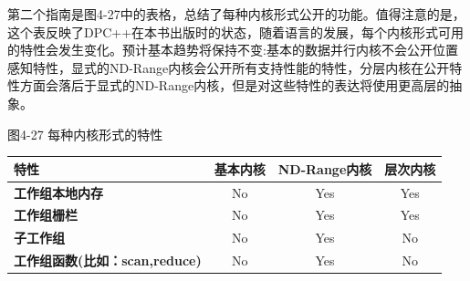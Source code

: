第二个指南是图4-27中的表格，总结了每种内核形式公开的功能。值得注意的是，这个表反映了DPC++在本书出版时的状态，随着语言的发展，每个内核形式可用的特性会发生变化。预计基本趋势将保持不变:基本的数据并行内核不会公开位置感知特性，显式的ND-Range内核会公开所有支持性能的特性，分层内核在公开特性方面会落后于显式的ND-Range内核，但是对这些特性的表达将使用更高层的抽象。\par

\hspace*{\fill} \par %
图4-27 每种内核形式的特性
\begin{table}[H]
	\begin{tabular}{|l|c|c|c|}
		\hline
		\textbf{特性}                           & \multicolumn{1}{l|}{\textbf{基本内核}} & \multicolumn{1}{l|}{\textbf{ND-Range内核}} & \multicolumn{1}{l|}{\textbf{层次内核}} \\ \hline
		\textbf{工作组本地内存}           & No                                         & Yes                                           & Yes                                              \\ \hline
		\textbf{工作组栅栏}               & No                                         & Yes                                           & Yes                                              \\ \hline
		\textbf{子工作组}                        & No                                         & Yes                                           & No                                               \\ \hline
		\textbf{工作组函数(比如：scan,reduce)} & No                                         & Yes                                           & No                                               \\ \hline
	\end{tabular}
\end{table}




